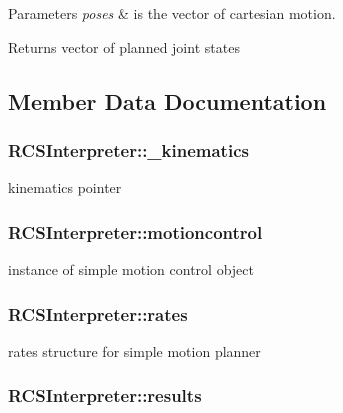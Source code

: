 \begin{DoxyParams}{Parameters}
{\em poses} & is the vector of cartesian motion. \\
\hline
\end{DoxyParams}
\begin{DoxyReturn}{Returns}
vector of planned joint states 
\end{DoxyReturn}


\subsection{Member Data Documentation}
\hypertarget{classRCSInterpreter_a0a78e67ba785253bf3de6877294da699}{
\subsubsection[{\-\_\-kinematics}]{ R\-C\-S\-Interpreter\-::\-\_\-kinematics}}\label{classRCSInterpreter_a0a78e67ba785253bf3de6877294da699}
kinematics pointer \hypertarget{classRCSInterpreter_ae59648ec8d61ea6957bbd320f2a4665a}{
\subsubsection[{motioncontrol}]{ R\-C\-S\-Interpreter\-::motioncontrol}}\label{classRCSInterpreter_ae59648ec8d61ea6957bbd320f2a4665a}
instance of simple motion control object \hypertarget{classRCSInterpreter_a11b1a673682a9d0451877d3b5c3e0e3e}{
\subsubsection[{rates}]{ R\-C\-S\-Interpreter\-::rates}}\label{classRCSInterpreter_a11b1a673682a9d0451877d3b5c3e0e3e}
rates structure for simple motion planner \hypertarget{classRCSInterpreter_a7b71ecaad68a14cc341d98d463e6f5b5}{
\subsubsection[{results}]{ R\-C\-S\-Interpreter\-::results}}\label{classRCSInterpreter_a7b71ecaad68a14cc341d98d463e6f5b5}
